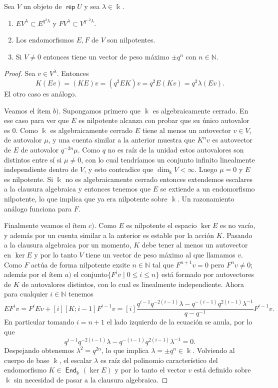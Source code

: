 \documentclass[11pt,fleqn]{article}
\newcommand\NN{\mathbb N}
\renewcommand\k{\Bbbk}
\DeclareMathOperator\rep{\mathsf{rep}}
\DeclareMathOperator\End{\mathsf{End}}
\begin{document}
\begin{Lemma*}
Sea $V$ un objeto de $\rep U$ y sea $\lambda \in \k$. 
\begin{enumerate}[$a)$]
	\item $E V^\lambda \subset E^{q^2\lambda}$ y $F V^\lambda \subset V^{q^{-2}\lambda}$.
	\item Los endomorfismos $E, F$ de $V$ son nilpotentes.
	\item Si $V \neq 0$ entonces tiene un vector de peso máximo $\pm q^n$ con $n \in \NN$.
\end{enumerate}
\end{Lemma*}
\begin{proof}
	Sea $v \in V^\lambda$. Entonces \[K(Ev) = (KE)v = (q^2EK)v = q^2E(Kv) = q^2 \lambda
	(Ev).\] El otro caso es análogo.

	Veamos el ítem $b)$. Supongamos primero que $\k$ es algebraicamente cerrado. En ese
	caso para ver que $E$ es nilpotente alcanza con probar que su único autovalor es $0$.
	Como $\k$ es algebraicamente cerrado $E$ tiene al menos un autovector $v \in V$, de
	autovalor $\mu$, y una cuenta similar a la anterior muestra que $K^n v$ es autovector
	de $E$ de autovalor $q^{-2n}\mu$. Como $q$ no es raíz de la unidad estos autovalores
	son distintos entre sí si $\mu \neq 0$, con lo cual tendríamos un conjunto infinito
	linealmente independiente dentro de $V$, y esto contradice que $\dim_\k V < \infty$.
	Luego $\mu = 0$ y $E$ es nilpotente. Si $\k$ no es algebraicamente cerrado entonces
	extendemos escalares a la clausura algebraica y entonces tenemos que $E$ se extiende a
	un endomorfismo nilpotente, lo que implica que ya era nilpotente sobre $\k$. Un
	razonamiento análogo funciona para $F$.

	Finalmente veamos el ítem $c)$. Como $E$ es nilpotente el espacio $\ker E$ es no 
   vacío, y además por un cuenta similar a la anterior es estable por la acción $K$. 
   Pasando a la clausura algebraica por un momento, $K$ debe tener al menos un autovector
   en $\ker E$ y por lo tanto $V$ tiene un vector de peso máximo al que llamamos $v$. 
   Como $F$ actúa de forma nilpotente exsite $n \in \NN$ tal que $F^{n+1}v = 0$ pero 
   $F^nv \neq 0$; además por el ítem $a)$ el conjunto$\{F^iv\mid 0 \leq i \leq n\}$ está 
   formado por autovectores de $K$ de autovalores distintos, con lo cual es linealmente 
   independiente. Ahora para cualquier $i \in \NN$ tenemos
   \[
      EF^iv = F^i Ev + [i][K;i-1]F^{i-1}v = [i]\frac{q^{i-1}q^{-2(i-1)} \lambda 
      - q^{-(i-1)}q^{2(i-1)}\lambda^{-1}}{q-q^{-1}} F^{i-1} v.
   \]
   En particular tomando $i = n+1$ el lado izquierdo de la ecuación se anula, por lo que
   \[
   q^{i-1}q^{-2(i-1)} \lambda - q^{-(i-1)}q^{2(i-1)}\lambda^{-1} = 0.
   \]
   Despejando obtenemos $\lambda^2 = q^{2n}$, lo que implica $\lambda = \pm q^n \in \k$. 
   Volviendo al cuerpo de base $\k$, el escalar $\lambda$ es raíz del polinomio 
   característico del endomorfismo $K \in \End_\k(\ker E)$ y por lo tanto el vector $v$
   está definido sobre $\k$ sin necesidad de pasar a la clausura algebraica.
\end{proof}
\end{document}
